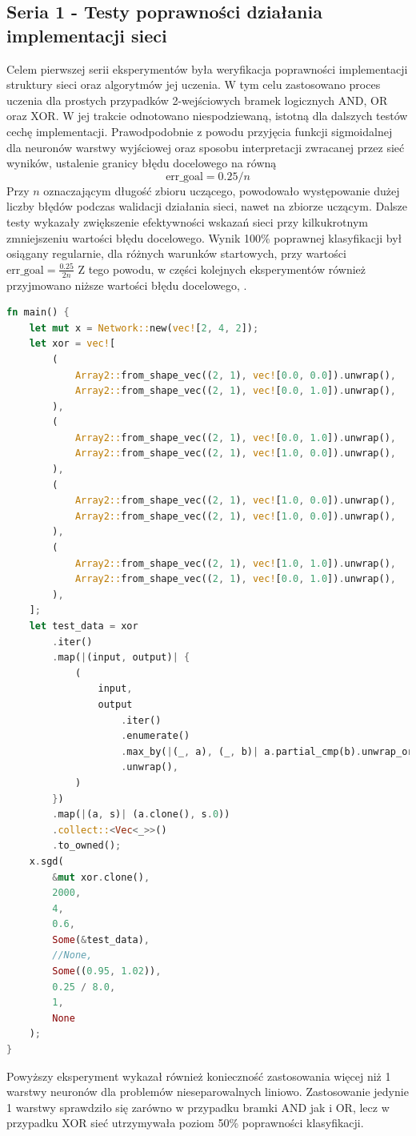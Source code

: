 \documentclass[12pt,twoside]{article}
\begin{document}
\subsection{Seria 1 - Testy poprawności działania implementacji sieci}
Celem pierwszej serii eksperymentów była weryfikacja poprawności implementacji struktury sieci oraz algorytmów jej uczenia.
W tym celu zastosowano proces uczenia dla prostych przypadków 2-wejściowych bramek logicznych AND, OR oraz XOR.
W jej trakcie odnotowano niespodziewaną, istotną dla dalszych testów cechę implementacji.
Prawodpodobnie z powodu przyjęcia funkcji sigmoidalnej dla neuronów warstwy wyjściowej oraz sposobu interpretacji zwracanej przez sieć wyników, ustalenie granicy błędu docelowego na równą
\begin{equation*}
    \text{err\_goal} = 0.25 / n
\end{equation*}
Przy $n$ oznaczającym długość zbioru uczącego, powodowało występowanie dużej liczby błędów podczas walidacji działania sieci, nawet na zbiorze uczącym.
Dalsze testy wykazały zwiększenie efektywności wskazań sieci przy kilkukrotnym zmniejszeniu wartości błędu docelowego.
Wynik 100\% poprawnej klasyfikacji był osiągany regularnie, dla różnych warunków startowych, przy wartości $\text{err\_goal} = \frac{0.25}{2n}$
Z tego powodu, w części kolejnych eksperymentów również przyjmowano niższe wartości błędu docelowego, .


\begin{lstlisting}[language=Rust,caption=Skrypt uczący dla bramki logicznej XOR,label={lst:example_xor}]
	fn main() {
    let mut x = Network::new(vec![2, 4, 2]);
    let xor = vec![
        (
            Array2::from_shape_vec((2, 1), vec![0.0, 0.0]).unwrap(),
            Array2::from_shape_vec((2, 1), vec![0.0, 1.0]).unwrap(),
        ),
        (
            Array2::from_shape_vec((2, 1), vec![0.0, 1.0]).unwrap(),
            Array2::from_shape_vec((2, 1), vec![1.0, 0.0]).unwrap(),
        ),
        (
            Array2::from_shape_vec((2, 1), vec![1.0, 0.0]).unwrap(),
            Array2::from_shape_vec((2, 1), vec![1.0, 0.0]).unwrap(),
        ),
        (
            Array2::from_shape_vec((2, 1), vec![1.0, 1.0]).unwrap(),
            Array2::from_shape_vec((2, 1), vec![0.0, 1.0]).unwrap(),
        ),
    ];
    let test_data = xor
        .iter()
        .map(|(input, output)| {
            (
                input,
                output
                    .iter()
                    .enumerate()
                    .max_by(|(_, a), (_, b)| a.partial_cmp(b).unwrap_or(std::cmp::Ordering::Equal))
                    .unwrap(),
            )
        })
        .map(|(a, s)| (a.clone(), s.0))
        .collect::<Vec<_>>()
        .to_owned();
    x.sgd(
        &mut xor.clone(),
        2000,
        4,
        0.6,
        Some(&test_data),
        //None,
        Some((0.95, 1.02)),
        0.25 / 8.0,
        1,
        None
    );
}
\end{lstlisting}
Powyższy eksperyment wykazał również konieczność zastosowania więcej niż 1 warstwy neuronów dla problemów nieseparowalnych liniowo.
Zastosowanie jedynie 1 warstwy sprawdziło się zarówno w przypadku bramki AND jak i OR, lecz w przypadku XOR sieć utrzymywała poziom 50\% poprawności klasyfikacji.
\end{document}
